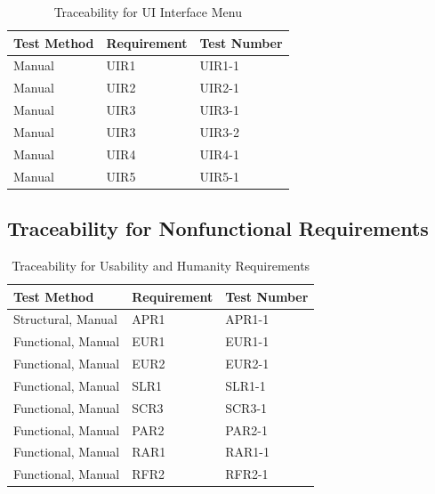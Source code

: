 \documentclass[12pt, titlepage]{article}
\begin{document}
\begin{table}[H]
\begin{tabular}{|p{}|p{}|p{}|}

\hline Test Method&Requirement&Test Number\\

\hline Manual&UIR1&UIR1-1\\

\hline Manual&UIR2&UIR2-1\\

\hline Manual&UIR3&UIR3-1\\

\hline Manual&UIR3&UIR3-2\\

\hline Manual&UIR4&UIR4-1\\

\hline Manual&UIR5&UIR5-1\\

\hline

\end{tabular}
\caption{Traceability for UI Interface Menu}
\end{table}

\subsection{Traceability for Nonfunctional Requirements}

\begin{table}[H]
\begin{tabular}{|p{}|p{}|p{}|}

\hline Test Method&Requirement&Test Number\\

\hline Structural, Manual&APR1&APR1-1\\

\hline Functional, Manual&EUR1&EUR1-1\\

\hline Functional, Manual&EUR2&EUR2-1\\

\hline Functional, Manual&SLR1&SLR1-1\\

\hline Functional, Manual&SCR3&SCR3-1\\

\hline Functional, Manual&PAR2&PAR2-1\\

\hline Functional, Manual&RAR1&RAR1-1\\

\hline Functional, Manual&RFR2&RFR2-1\\

\hline

\end{tabular}
\caption{Traceability for Usability and Humanity Requirements}
\end{table}
\end{document}
